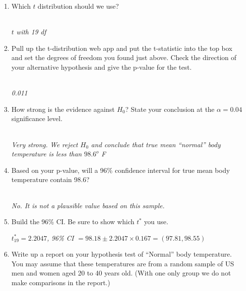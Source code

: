 \begin{enumerate}
\item Which $t$ distribution should we use?
\begin{students}
  \vspace{1cm}
\end{students}
\begin{key}
\\ {\it $t$ with 19 df}
\end{key}



\item Pull up the t-distribution web app and put the t-statistic into
  the top box and set the degrees of freedom you found just
  above. Check the direction of your alternative hypothesis and give
  the p-value for the test.
\begin{students}
  \vspace{1cm}
\end{students}
\begin{key}
\\ {\it 0.011}
\end{key}
\item  How strong is the evidence against $H_0$?  State your
  conclusion at the $\alpha = 0.04$ significance level.
\begin{students}
  \vspace{1cm}
\end{students}
\begin{key}
\\ {\it Very strong. We reject $H_0$ and conclude that true mean
  ``normal'' body temperature is less than $98.6^o$ F}
\end{key}

\item Based on your p-value, will a 96\% confidence interval for true
  mean body temperature contain 98.6?
\begin{students}
  \vspace{1cm}
\end{students}
\begin{key}
\\ {\it No. It is not a plausible value based on this sample.}
\end{key}

\item Build the 96\% CI.  Be sure to show which $t^*$ you use.
\begin{students}
  \vspace{1cm}
\end{students}
\begin{key}
 {\it $t^*_{19} = 2.2047$, 96\% CI $= 98.18 \pm 2.2047 \times 0.167 =
   (97.81, 98.55)$} 
\end{key}

\item Write up a report on  your hypothesis test of ``Normal'' body
  temperature.  You 
  may assume that these temperatures are from a random sample of US
  men and women aged 20 to 40 years old. (With one only group we do not make
  comparisons in the report.)

\end{enumerate}



